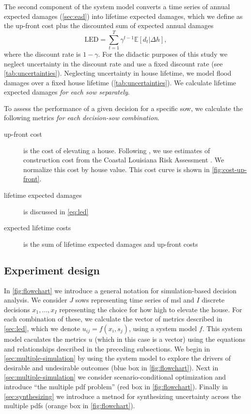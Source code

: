\documentclass[12pt]{article}
\begin{document}
The second component of the system model converts a time series of annual expected damages (\cref{sec:ead}) into lifetime expected damages, which we define as the up-front cost plus the discounted sum of expected annual damages
\begin{equation}\label{eq:led}
    \textrm{LED} = \sum_{t=1}^T \gamma^{t-1} \mathbb{E}[d_t | \Delta h],
\end{equation}
where the discount rate is $1 - \gamma$.
For the didactic purposes of this study we neglect uncertainty in the discount rate \citep{zarekarizi_suboptimal:2020,arrow_discount:2013} and use a fixed discount rate (see \cref{tab:uncertainties}).
Neglecting uncertainty in house lifetime, we model flood damages over a fixed house lifetime (\cref{tab:uncertainties}).
We calculate lifetime expected damages \emph{for each \gls{sow} separately}.

To assess the performance of a given decision for a specific \gls{sow}, we calculate the following metrics \emph{for each decision-\gls{sow} combination}.
\begin{description}
    \item[up-front cost] is the cost of elevating a house. Following \citet{zarekarizi_suboptimal:2020}, we use estimates of construction cost from the Coastal Louisiana Risk Assessment \citep{fischbach_clara:2012}. We normalize this cost by house value. This cost curve is shown in \cref{fig:cost-up-front}.
    \item[lifetime expected damages] is discussed in \cref{eq:led}
    \item[expected lifetime costs] is the sum of lifetime expected damages and up-front costs
\end{description}

\subsection{Experiment design}

In \cref{fig:flowchart} we introduce a general notation for simulation-based decision analysis.
We consider $J$ \glspl{sow} representing time series of \gls{msl} and $I$ discrete decisions $x_1, \ldots, x_I$ representing the choice for how high to elevate the house.
For each combination of these, we calculate the vector of metrics described in \cref{sec:led}, which we denote $u_{ij} = f(x_i, s_j)$, using a system model $f$.
This system model caculates the metrics $u$ (which in this case is a vector) using the equations and relationships described in the preceding subsections.
We begin in \cref{sec:multiple-simulation} by using the system model to explore the drivers of desirable and undesirable outcomes (blue box in \cref{fig:flowchart}).
Next in \cref{sec:multiple-simulation} we consider scenario-conditional optimization and introduce ``the multiple \gls{pdf} problem'' (red box in \cref{fig:flowchart}).
Finally in \cref{sec:synthesizing} we introduce a metnod for synthesizing uncertainty across the multiple \glspl{pdf} (orange box in \cref{fig:flowchart}).
\end{document}
